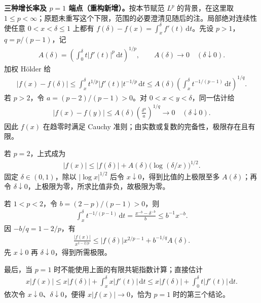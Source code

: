 \documentclass[../../main.tex]{subfiles}
\begin{document}
\begin{solution}
\textbf{三种增长率及 $p=1$ 端点（重构新增）。}按本节赋范 $L^p$ 的背景，在这里取 $1\leqslant p<\infty$；原题未重写这个下限，范围的必要澄清见随后的注。局部绝对连续性使任意 $0<x<\delta\leqslant1$ 上都有 $f(\delta)-f(x)=\int_x^\delta f'(t)\,\mathrm dt$。先设 $p>1$，$q=p/(p-1)$，记
\begin{align*}
A(\delta)=\left(\int_0^\delta t|f'(t)|^p\,\mathrm dt\right)^{1/p},
\qquad A(\delta)\longrightarrow0\quad(\delta\downarrow0).
\end{align*}
加权 Hölder 给
\begin{align*}
|f(x)-f(\delta)|
\leqslant\int_x^\delta t^{1/p}|f'(t)|t^{-1/p}\,\mathrm dt
\leqslant A(\delta)\left(\int_x^\delta t^{-1/(p-1)}\,\mathrm dt\right)^{1/q}.
\end{align*}
若 $p>2$，令 $a=(p-2)/(p-1)>0$。对 $0<x<y<\delta$，同一估计给
\begin{align*}
|f(x)-f(y)|\leqslant A(\delta)\left(\frac{\delta^a}{a}\right)^{1/q}\longrightarrow0
\quad(\delta\downarrow0).
\end{align*}
因此 $f(x)$ 在趋零时满足 Cauchy 准则；由实数或复数的完备性，极限存在且有限。

若 $p=2$，上式成为
\begin{align*}
|f(x)|\leqslant|f(\delta)|+A(\delta)\bigl(\log(\delta/x)\bigr)^{1/2}.
\end{align*}
固定 $\delta\in(0,1)$，除以 $|\log x|^{1/2}$ 后令 $x\downarrow0$，得到比值的上极限至多 $A(\delta)$；再令 $\delta\downarrow0$，上极限为零，所求比值非负，故极限为零。

若 $1<p<2$，令 $b=(2-p)/(p-1)>0$，则
\begin{align*}
\int_x^\delta t^{-1/(p-1)}\,\mathrm dt
=\frac{x^{-b}-\delta^{-b}}b\leqslant b^{-1}x^{-b}.
\end{align*}
因 $-b/q=1-2/p$，有
\begin{align*}
\frac{|f(x)|}{x^{1-2/p}}
\leqslant |f(\delta)|x^{2/p-1}+b^{-1/q}A(\delta).
\end{align*}
先 $x\downarrow0$ 再 $\delta\downarrow0$，得到所需极限。

最后，当 $p=1$ 时不能使用上面的有限共轭指数计算；直接估计
\begin{align*}
x|f(x)|\leqslant x|f(\delta)|+\int_x^\delta x|f'(t)|\,\mathrm dt
\leqslant x|f(\delta)|+\int_0^\delta t|f'(t)|\,\mathrm dt.
\end{align*}
依次令 $x\downarrow0$、$\delta\downarrow0$，便得 $x|f(x)|\to0$，恰为 $p=1$ 时的第三个结论。
\end{solution}
\end{document}
